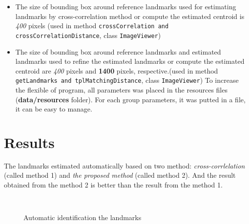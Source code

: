 \begin{itemize}
\begin{itemize}
	\end{itemize}
\item The size of bounding box around reference landmarks used for estimating landmarks by cross-correlation method or compute the estimated centroid is \textit{400} pixels (used in method \texttt{crossCorrelation and crossCorrelationDistance}, class \texttt{ImageViewer})
\item The size of bounding box around reference landmarks and estimated landmarks used to refine the estimated landmarks or compute the estimated centroid are \textit{400} pixels and \textbf{1400} pixels, respective.(used in method \texttt{getLandmarks and tplMatchingDistance}, class \texttt{ImageViewer})
To increase the flexible of program, all parameters was placed in the resources files (\textbf{data/resources} folder). For each group parameters, it was putted in a file, it can be easy to manage.
\end{itemize}
\section{Results}
The landmarks estimated automatically based on two method: \textit{cross-corrlelation} (called method 1) and \textit{the proposed method} (called method 2). And the result obtained from the method 2 is better than the result from the method 1.
\begin{figure}[h!]
\centering
{}~~
\caption{Automatic identification the landmarks}
\label{fig:figure_31}

\end{figure}